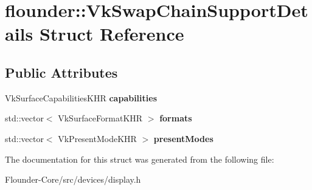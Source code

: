\hypertarget{structflounder_1_1_vk_swap_chain_support_details}{}\section{flounder\+:\+:Vk\+Swap\+Chain\+Support\+Details Struct Reference}
\label{structflounder_1_1_vk_swap_chain_support_details}
\subsection*{Public Attributes}
\begin{DoxyCompactItemize}
\item 
\mbox{\label{structflounder_1_1_vk_swap_chain_support_details_a29e86da1f60a5984de9b8c28da5b7c62}} 
Vk\+Surface\+Capabilities\+K\+HR {\bfseries capabilities}
\item 
\mbox{\label{structflounder_1_1_vk_swap_chain_support_details_a9e0d17f762ec3e42131c7e7f48e19262}} 
std\+::vector$<$ Vk\+Surface\+Format\+K\+HR $>$ {\bfseries formats}
\item 
\mbox{\label{structflounder_1_1_vk_swap_chain_support_details_accba1d2e50e0bd22cc0894240e6f1e9a}} 
std\+::vector$<$ Vk\+Present\+Mode\+K\+HR $>$ {\bfseries present\+Modes}
\end{DoxyCompactItemize}


The documentation for this struct was generated from the following file\+:\begin{DoxyCompactItemize}
\item 
Flounder-\/\+Core/src/devices/display.\+h\end{DoxyCompactItemize}
